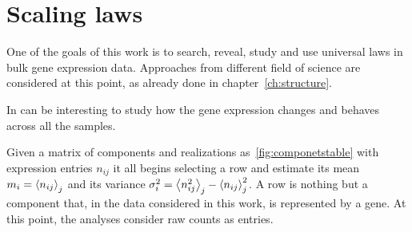 \chapter{Scaling laws}\label{ch:scalinglaws}
One of the goals of this work is to search, reveal, study and use universal laws in bulk gene expression data. Approaches from different field of science are considered at this point, as already done in chapter~\ref{ch:structure}.~\nocite{altmann2016statistical}

In can be interesting to study how the gene expression changes and behaves across all the samples.

Given a matrix of components and realizations as~\ref{fig:componetstable} with expression entries $n_{i j}$ it all begins selecting a row and estimate its mean $m_i=\left\langle n_{i
 j}\right\rangle_j$ and its variance $\sigma^2_{i}=\left\langle n_{i j}^2\right\rangle_j - \left\langle n_{i j}\right\rangle^2_j$. A row is nothing but a component that, in the data considered in this work, is represented by a gene. At this point, the analyses consider raw counts as entries.  


\FloatBarrier

\FloatBarrier
